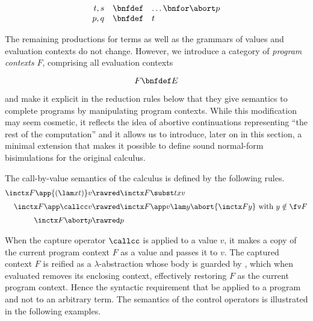 \documentclass{lmcs}
\theoremstyle{defC}
\begin{document}
\[
  \begin{array}{rcl}
    t, s & \bnfdef & \ldots \bnfor \abort p
    \\
    p, q & \bnfdef & t
  \end{array}
\]

\vspace{2mm}\noindent The remaining productions for terms as well as
the grammars of values and evaluation contexts do not change. However,
we introduce a category of \emph{program contexts} $F$, comprising all
evaluation contexts

\[
F \bnfdef E
\]

\vspace{2mm}\noindent and make it explicit in the reduction rules
below that they give semantics to complete programs by manipulating
program contexts. While this modification may seem cosmetic, it
reflects the idea of abortive continuations representing ``the rest of
the computation'' and it allows us to introduce, later on in this
section, a minimal extension that makes it possible to define sound
normal-form bisimulations for the original calculus.

The call-by-value semantics of the calculus is defined by the
following rules.
\vspace{1mm}
\begin{align*}
  \inctx F {\app {(\lam x t)} v} & \rawred
  \inctx F {\subst t x v}
  \\[1mm]
  \inctx F {\app \callcc v} & \rawred \inctx F {\app v {\lam y
                                       {\abort {\inctx F y}}}} \mbox{ with } y
                                       \notin \fv F
  \\[1mm]
  \inctx F {\abort p} & \rawred p
\end{align*}

\vspace{2mm}\noindent When the capture operator $\callcc$ is applied
to a value $v$, it makes a copy of the current program context $F$ as
a value and passes it to $v$. The captured context $F$ is reified as a
$\lambda$-abstraction whose body is guarded by \textabort, which when
evaluated removes its enclosing context, effectively restoring $F$ as
the current program context. Hence the syntactic requirement that
\textabort be applied to a program and not to an arbitrary term. The
semantics of the control operators is illustrated in the following
examples.
\end{document}
